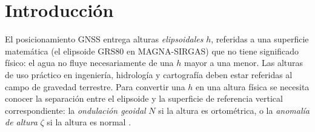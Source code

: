 \documentclass[11pt,letterpaper]{article}
\begin{document}
\begin{abstract}
En los cinco puntos de control, la diferencia QGeoidCOL2023 $-$ GeoCol2004 ($\zeta-N$) es negativa,
de \SI{-0.73}{m} a \SI{-4.07}{m} (media \SI{-2.14}{m}). No se explica por la separación
geoide--cuasigeoide sino por el sesgo de GeoCol2004, cuya diferencia media con la nivelación en
estos puntos (\SI{-2.1}{m}) es del orden de la documentada para ese modelo. Frente a EGM2008
(ondulación geoidal), la diferencia va de \SI{-21}{cm} a \SI{+70}{cm} (RMS de \SI{36}{cm}). Como
control altimétrico, en los tres puntos bajos (P1, P2 y P5) la altura normal calculada con
QGeoidCOL2023 difiere de la altura nivelada en \SI{-1.8}{cm}, \SI{+15.9}{cm} y \SI{+1.0}{cm}
(RMS de \SI{9}{cm}), frente a \SI{47}{cm} con EGM2008 y \SI{112}{cm} con GeoCol2004. En los dos
puntos de montaña (P3 y P4) las diferencias con la nivelación son de \SI{+65}{cm} y \SI{-62}{cm},
de magnitud similar a las de EGM2008. En las dos herramientas, la elección del modelo de geoide
influye en la altura mucho más que la del método de interpolación.
\end{abstract}

\tableofcontents
\vspace{0.6cm}

\section{Introducción}

El posicionamiento GNSS entrega alturas \emph{elipsoidales} $h$, referidas a una
superficie matemática (el elipsoide GRS80 en MAGNA-SIRGAS) que no tiene significado
físico: el agua no fluye necesariamente de una $h$ mayor a una menor. Las alturas de uso
práctico en ingeniería, hidrología y cartografía deben estar referidas al campo de
gravedad terrestre. Para convertir una $h$ en una altura física se necesita conocer la
separación entre el elipsoide y la superficie de referencia vertical correspondiente: la
\emph{ondulación geoidal} $N$ si la altura es ortométrica, o la \emph{anomalía de altura}
$\zeta$ si la altura es normal \citep{hofmannmoritz2006,torgemuller2012}.
\end{document}
